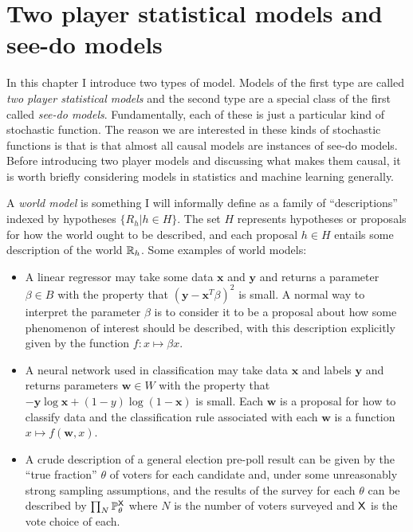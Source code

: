 

\chapter{Two player statistical models and see-do models}


In this chapter I introduce two types of model. Models of the first type are called \emph{two player statistical models} and the second type are a special class of the first called \emph{see-do models}. Fundamentally, each of these is just a particular kind of stochastic function. The reason we are interested in these kinds of stochastic functions is that is that almost all causal models are instances of see-do models. Before introducing two player models and discussing what makes them causal, it is worth briefly considering models in statistics and machine learning generally.

A \emph{world model} is something I will informally define as a family of ``descriptions'' indexed by hypotheses $\{R_h|h\in H\}$. The set $H$ represents hypotheses or proposals for how the world ought to be described, and each proposal $h\in H$ entails some description of the world $\mathbb{R}_h$. Some examples of world models:

\begin{itemize}
    \item A linear regressor may take some data $\mathbf{x}$ and $\mathbf{y}$ and returns a parameter $\beta\in B$ with the property that $(\mathbf{y}-\mathbf{x}^T \beta)^2$ is small. A normal way to interpret the parameter $\beta$ is to consider it to be a proposal about how some phenomenon of interest should be described, with this description explicitly given by the function $f:x\mapsto \beta x$.
    \item A neural network used in classification may take data $\mathbf{x}$ and labels $\mathbf{y}$ and returns parameters $\mathbf{w}\in W$ with the property that $-\mathbf{y} \log \mathbf{x}+(1-y)\log(1-\mathbf{x})$ is small. Each $\mathbf{w}$ is a proposal for how to classify data and the classification rule associated with each $\mathbf{w}$ is a function $x\mapsto f(\mathbf{w},x)$.
    \item A crude description of a general election pre-poll result can be given by the ``true fraction'' $\theta$ of voters for each candidate and, under some unreasonably strong sampling assumptions, and the results of the survey for each $\theta$ can be described by $\prod_N\mathbb{P}_\theta^{\mathsf{X}}$ where $N$ is the number of voters surveyed and $\mathsf{X}$ is the vote choice of each.
\end{itemize}

